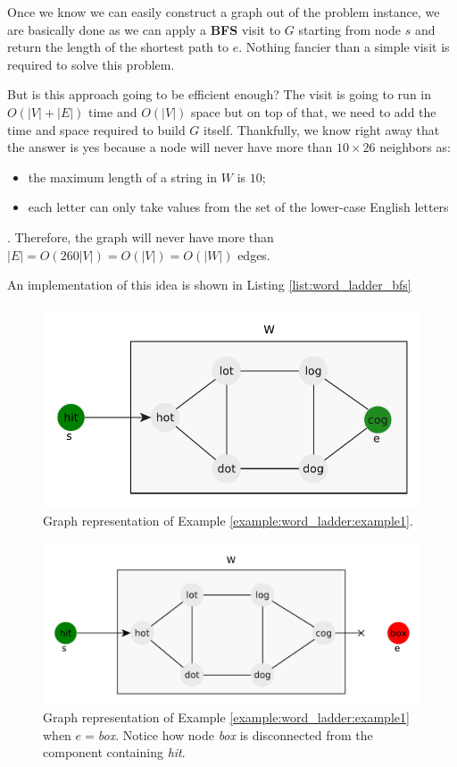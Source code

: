 Once we know we can easily construct a graph out of the problem instance, we are basically done as we can apply a \textbf{BFS} visit to $G$ starting from node $s$ and return the length of the shortest path to $e$.
Nothing fancier than a simple visit is required to solve this problem.

But is this approach going to be efficient enough? The visit is going to run in $O(|V|+|E|)$ time and $O(|V|)$ space but on top of that, we need to add the time and space required to build $G$ itself. 
Thankfully, we know right away that the answer is yes because a node will never have more than $10\times 26$ neighbors as:
\begin{itemize}
    \item the maximum length of a string in $W$ is $10$;
    \item each letter can only take values from the set of the lower-case English letters
\end{itemize}.
Therefore, the graph will never have more than $|E|=O(260|V|)=O(|V|)=O(|W|)$ edges.

An implementation of this idea is shown in Listing \ref{list:word_ladder_bfs}

    \begin{figure}[]
        \centering
        \includegraphics[width=\textwidth]{sources/word_ladder/images/example1}
        \caption[n]{Graph representation of Example \ref{example:word_ladder:example1}.}
        \label{fig:word_ladder:example1}
    \end{figure}
    \begin{figure}[]
        \centering
        \includegraphics[width=\textwidth]{sources/word_ladder/images/example2}
        \caption[n]{Graph representation of Example \ref{example:word_ladder:example1} when $e=$\textit{box}. Notice how node \textit{box} is disconnected from the component containing \textit{hit}.}
        \label{fig:word_ladder:example1_impossible}
    \end{figure}
    

